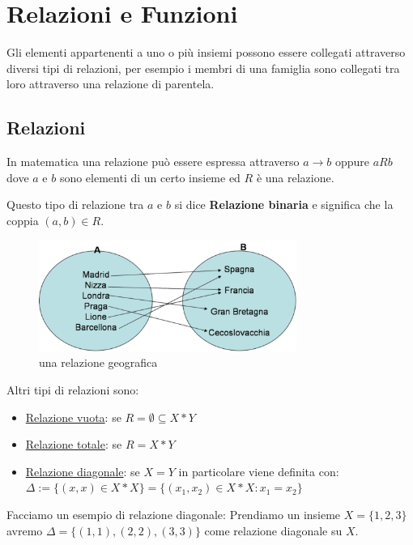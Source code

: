 \documentclass{article}
\begin{document}
\newpage
\section{Relazioni e Funzioni}
Gli elementi appartenenti a uno o più insiemi possono essere collegati attraverso diversi tipi di relazioni, per esempio i membri di una famiglia sono collegati tra loro attraverso una relazione di parentela. \par


\subsection{Relazioni}
In matematica una relazione può essere espressa attraverso $ a \to b$ oppure $ a R b $ dove $ a $ e $ b $ sono elementi di un certo insieme ed $ R $ è una relazione. \par
Questo tipo di relazione tra $ a $ e $ b $ si dice \textbf{Relazione binaria} e significa che la coppia $ (a,b) \in R $. \par

\begin{figure}[h]
        \centering
                \includegraphics[width=0.75\textwidth]{relazioni.png}
        \caption{una relazione geografica}\label{fig:esempio_relazione}
\end{figure}

Altri tipi di relazioni sono:
\begin{itemize}
        \item \underline{Relazione vuota}: se $ R = \emptyset \subseteq X*Y $ 
        \item \underline{Relazione totale}: se $ R = X*Y $ 
        \item \underline{Relazione diagonale}: se $ X=Y $ in particolare viene definita con: \newline $ \Delta := \{(x,x) \in X*X\} = \{(x_1,x_2) \in X*X : x_1 = x_2\} $  
\end{itemize}
Facciamo un esempio di relazione diagonale: \newline
Prendiamo un insieme $ X = \{1,2,3\} $ avremo $ \Delta = \{(1,1), (2,2),(3,3)\} $ come relazione diagonale su $ X $.
\end{document}
